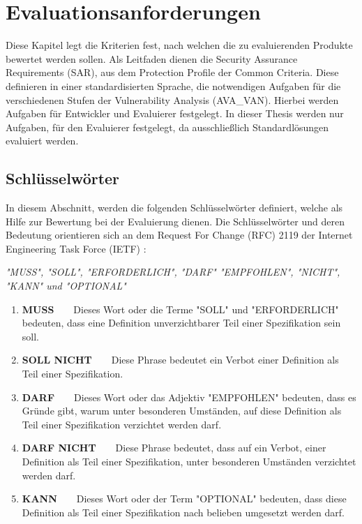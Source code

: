 \documentclass[11pt,a4paper]{report}
\begin{document}
\chapter{Evaluationsanforderungen} \label{chap:eval_req}

Diese Kapitel legt die Kriterien fest, nach welchen die zu evaluierenden Produkte bewertet werden sollen. Als Leitfaden dienen die Security Assurance Requirements (SAR), aus dem Protection Profile der Common Criteria. Diese definieren in einer standardisierten Sprache, die notwendigen Aufgaben für die verschiedenen Stufen der Vulnerability Analysis (AVA\_VAN). Hierbei werden Aufgaben für Entwickler und Evaluierer festgelegt. In dieser Thesis werden nur Aufgaben, für den Evaluierer festgelegt, da ausschließlich Standardlösungen evaluiert werden.

\section{Schlüsselwörter}

In diesem Abschnitt, werden die folgenden Schlüsselwörter definiert, welche als Hilfe zur Bewertung bei der Evaluierung dienen. Die Schlüsselwörter und deren Bedeutung orientieren sich an dem Request For Change (RFC) 2119 der Internet Engineering Task Force (IETF) \cite{rfc_2119}:

\begin{center}
\textit{"MUSS", "SOLL", "ERFORDERLICH", "DARF" "EMPFOHLEN", "NICHT", "KANN" und "OPTIONAL"}
\end{center} 

\begin{enumerate}
\item \textbf{MUSS}~~~~Dieses Wort oder die Terme "SOLL" und "ERFORDERLICH" bedeuten, dass eine  Definition unverzichtbarer Teil einer Spezifikation sein soll.
\item \textbf{SOLL NICHT}~~~~Diese Phrase bedeutet ein Verbot einer Definition als Teil einer Spezifikation.
\item \textbf{DARF}~~~~Dieses Wort oder das Adjektiv "EMPFOHLEN" bedeuten, dass es  Gründe gibt, warum unter besonderen Umständen, auf diese Definition als Teil einer Spezifikation verzichtet werden darf. 
\item \textbf{DARF NICHT}~~~~Diese Phrase bedeutet, dass auf ein Verbot, einer Definition als Teil einer Spezifikation, unter besonderen Umständen verzichtet werden darf.
\item \textbf{KANN}~~~~Dieses Wort oder der Term "OPTIONAL" bedeuten, dass diese Definition als Teil einer Spezifikation nach belieben umgesetzt werden darf.
\end{enumerate}
\end{document}
